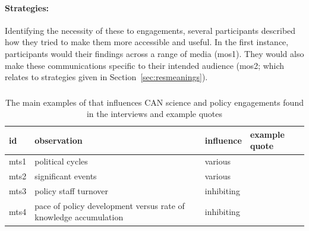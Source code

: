 \paragraph{Strategies:}
Identifying the necessity of these \ismmo{} to engagements, several participants described how they tried to make them more accessible and useful. In the first instance, participants would  their findings across a range of media (mos1). They would also make these communications specific to their intended audience (mos2; which relates to strategies given in Section~\ref{sec:resmeanings}).

\subsubsection{\ismmts}\label{sec:restimes}


\begin{table}[!ht]
\footnotesize
\caption{The main examples of \ismmts{} that influences CAN science and policy  engagements found in the interviews and example quotes}\label{tab:restime}
\begin{tabular}{L{.06\linewidth}L{.3\linewidth}L{.12\linewidth}L{.52\linewidth}} \hline
\textbf{id} & \textbf{observation} & \textbf{influence} & \textbf{example quote} \\ \hline \hline 
mts1 & political cycles & various &  \\[5mm]
mts2 & significant events & various &  \\[5mm]
mts3 & policy staff turnover & inhibiting &  \\[5mm]
mts4 & pace of policy development versus rate of knowledge accumulation & inhibiting &  \\[5mm]
 \hline
\end{tabular}
\end{table}

